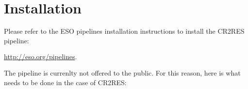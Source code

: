 \section{Installation}
\label{installation}

Please refer to the ESO pipelines installation instructions to install the CR2RES pipeline:

\href{http://eso.org/pipelines}{http://eso.org/pipelines}.

The pipeline is currenlty not offered to the public. For this reason, here is what needs to be done in the case of CR2RES:






